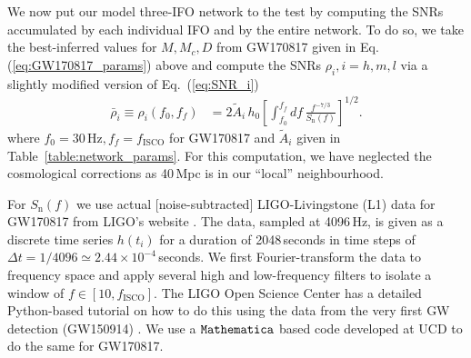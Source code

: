 \documentclass[prd,amsmath,amssymb,aps,floats,amsfonts,notitlepage,superscriptaddress,eqsecnum,nofootinbib,10pt]{revtex4-1}
\newcommand{\f}{\frac}
\begin{document}
We now put our model three-IFO network to the test
by computing the SNRs accumulated by each individual IFO and by the entire network. To do so, we take the best-inferred values for $M,M_c,D$ from GW170817 given in Eq.(\ref{eq:GW170817_params}) above and compute the SNRs $\rho_i, i=h,m,l$ via a slightly modified version of Eq.~(\ref{eq:SNR_i})
%
\begin{align}
\bar{\rho}_i\equiv\rho_i(f_0,f_f) &= 2\tilde{A}_i\, h_0\left[ \int_{f_0}^{f_f} df\, \f{f^{-7/3}}{S_\text{n}(f)}\right]^{1/2} \label{eq:SNR_i_with_fi}.
\end{align}
%
where $f_0 =30\,\text{Hz}, f_f= f_\text{ISCO}$ for GW170817 and $\tilde{A}_i$ given in Table~\ref{table:network_params}.
For this computation, we have neglected the cosmological corrections as 40\,Mpc is in our ``local'' neighbourhood.

For $S_\text{n}(f)$ we use actual [noise-subtracted] LIGO-Livingstone (L1) data for GW170817 from LIGO's website \cite{LIGO_L1_data}.
The data, sampled at 4096\,Hz, is given as a discrete time series $h(t_i)$ for a duration of 2048\,seconds in time steps of $\Delta t=1/4096\simeq 2.44\times 10^{-4}\,$seconds.
We first Fourier-transform the data to frequency space and apply several high and low-frequency filters to isolate a window of $f\in [10, f_\text{ISCO}]$.
The LIGO Open Science Center has a detailed Python-based tutorial on how to do this using the data from the very first GW detection (GW150914) \cite{LIGO_tutorial}. 
We use a $\verb|Mathematica|$ based code developed at UCD to do the same for GW170817.
\end{document}
